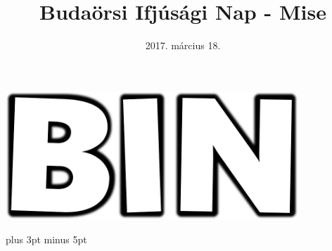 \documentclass[a5paper,twoside]{article}
\title{Budaörsi Ifjúsági Nap - Mise}
\date{2017. március 18.}
\begin{document}
  \begin{titlepage}
    \setlength{\oddsidemargin}{-1.3cm}
    \vspace*{3cm}
    \includegraphics[width=11cm]{bin_logo}
    \vspace*{3cm}
    {\let\newpage\relax\maketitle}
  \end{titlepage}


  \versesep=12pt plus 3pt minus 5pt
\end{document}

